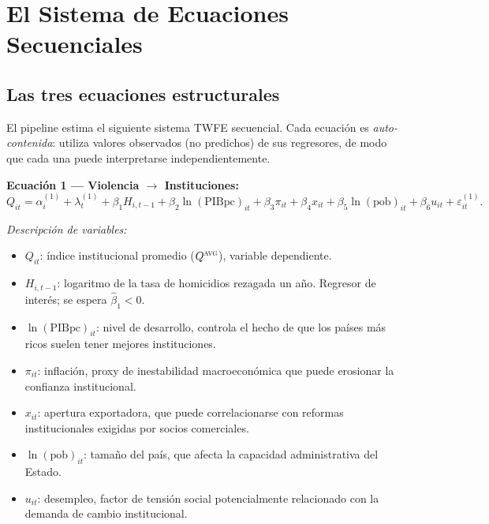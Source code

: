 \documentclass[12pt, a4paper]{article}
\theoremstyle{definition}
\begin{document}
\section{El Sistema de Ecuaciones Secuenciales}

\subsection{Las tres ecuaciones estructurales}

El pipeline estima el siguiente sistema TWFE secuencial. Cada ecuación es \emph{auto-contenida}: utiliza valores observados (no predichos) de sus regresores, de modo que cada una puede interpretarse independientemente.

\medskip
\noindent\textbf{Ecuación 1 — Violencia $\to$ Instituciones:}
\begin{equation}
  Q_{it} = \alpha_i^{(1)} + \lambda_t^{(1)} + \beta_1 H_{i,t-1} + \beta_2 \ln(\text{PIBpc})_{it} + \beta_3 \pi_{it} + \beta_4 x_{it} + \beta_5 \ln(\text{pob})_{it} + \beta_6 u_{it} + \varepsilon^{(1)}_{it}. \label{eq:1}
\end{equation}

\noindent\textit{Descripción de variables:}
\begin{itemize}
  \item $Q_{it}$: índice institucional promedio ($Q^{\textsc{avg}}$), variable dependiente.
  \item $H_{i,t-1}$: logaritmo de la tasa de homicidios rezagada un año. Regresor de interés; se espera $\hat\beta_1 < 0$.
  \item $\ln(\text{PIBpc})_{it}$: nivel de desarrollo, controla el hecho de que los países más ricos suelen tener mejores instituciones.
  \item $\pi_{it}$: inflación, proxy de inestabilidad macroeconómica que puede erosionar la confianza institucional.
  \item $x_{it}$: apertura exportadora, que puede correlacionarse con reformas institucionales exigidas por socios comerciales.
  \item $\ln(\text{pob})_{it}$: tamaño del país, que afecta la capacidad administrativa del Estado.
  \item $u_{it}$: desempleo, factor de tensión social potencialmente relacionado con la demanda de cambio institucional.
\end{itemize}
\end{document}
